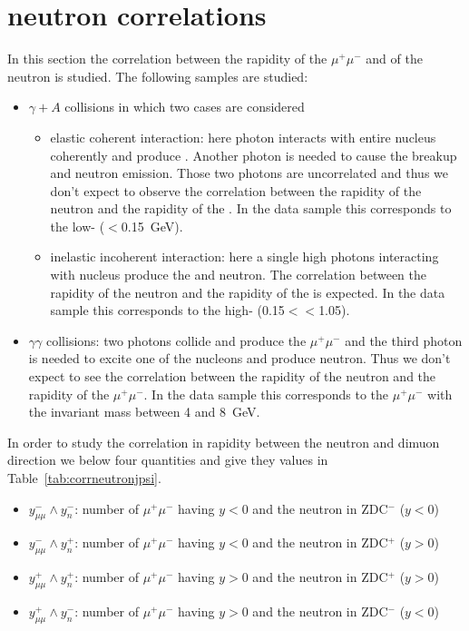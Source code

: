   \section{\JPsi{} neutron correlations~\label{sec:upcCor}}
    In this section the correlation between the rapidity of the $\mu^{+}\mu^{-}$ 
      and of the neutron is studied. The following samples are studied: 
    \begin{itemize}
      \item $\gamma + A$ collisions in which two cases are considered
      \begin{itemize}
        \item elastic coherent interaction: here photon interacts with entire
          nucleus coherently and produce \JPsi. 
          Another photon is needed to cause the breakup and neutron emission. 
          Those two photons are uncorrelated and thus we don't expect to 
            observe the correlation between the rapidity of the neutron and the
            rapidity of the \JPsi.
          In the data sample this corresponds to the low-\pt \JPsi 
            (\pt$<$0.15~GeV). 
        \item inelastic incoherent interaction: here a single high \pt photons
          interacting with nucleus produce the \JPsi and neutron. 
          The correlation between the rapidity of the neutron and the rapidity
            of the \JPsi is expected.
          In the data sample this corresponds to the high-\pt \JPsi 
            (0.15$<$\pt$<$1.05). 
      \end{itemize}
      \item $\gamma \gamma$ collisions: two photons collide and produce the 
        $\mu^{+}\mu^{-}$  and the third photon is needed to excite one of
          the nucleons and produce neutron. 
        Thus we don't expect to see the correlation between the rapidity of the
          neutron and the rapidity of the $\mu^{+}\mu^{-}$. 
        In the data sample this corresponds to the $\mu^{+}\mu^{-}$ with the
          invariant mass between 4 and 8~GeV. 
    \end{itemize}

    In order to study the correlation in rapidity between the neutron and
      dimuon direction we below four quantities and give they values in 
      Table~\ref{tab:corrneutronjpsi}.  
    \begin{itemize}
      \item $y^{-}_{\mu\mu} \wedge y_{n}^{-}$: number of $\mu^{+}\mu^{-}$ having
         $y<0$ and the neutron in ZDC$^{-}$ ($y<0$)
      \item $y^{-}_{\mu\mu} \wedge y_{n}^{+}$: number of $\mu^{+}\mu^{-}$ having
         $y<0$ and the neutron in ZDC$^{+}$ ($y>0$)
      \item $y^{+}_{\mu\mu} \wedge y_{n}^{+}$: number of $\mu^{+}\mu^{-}$ having
         $y>0$ and the neutron in ZDC$^{+}$ ($y>0$)
      \item $y^{+}_{\mu\mu} \wedge y_{n}^{-}$: number of $\mu^{+}\mu^{-}$ having
         $y>0$ and the neutron in ZDC$^{-}$ ($y<0$)
    \end{itemize}

